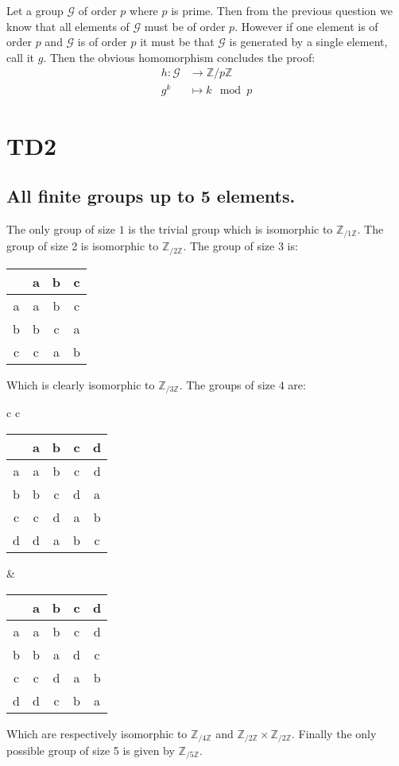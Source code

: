 \documentclass[10pt,a4paper]{book}
\begin{document}
\subsection{}
Let a group $\mathcal{G}$ of order $p$ where $p$ is prime. Then from the previous question we know that all elements of $\mathcal{G}$ must be of order $p$. However if one element is of order $p$ and $\mathcal{G}$ is of order $p$ it must be that $\mathcal{G}$ is generated by a single element, call it $g$. Then the obvious homomorphism concludes the proof:
\begin{align*}
h : \mathcal{G} &\to \mathbb{Z}/p\mathbb{Z}\\
g^k &\mapsto k \mod p
\end{align*}

\chapter{TD2}
\section{All finite groups up to 5 elements.}
The only group of size $1$ is the trivial group which is isomorphic to $\mathbb{Z}_{/1\mathbb{Z}}$. The group of size 2 is isomorphic to $\mathbb{Z}_{/2\mathbb{Z}}$. The group of size 3 is:
\begin{center}
\begin{tabular}{c | c | c | c |}
 & a & b & c\\
 \hline
 a & a & b & c\\
 \hline
 b & b & c & a \\
 \hline
 c & c & a & b

\end{tabular}
\end{center}
Which is clearly isomorphic to $\mathbb{Z}_{/3\mathbb{Z}}$. The groups of size 4 are:
\begin{center}
\begin{tabular}{c c}
\begin{tabular}{c | c | c | c | c |}
 & a & b & c & d\\
 \hline
 a & a & b & c & d\\
 \hline
 b & b & c & d & a\\
 \hline
 c & c & d & a & b\\
 \hline
 d & d & a & b & c
\end{tabular}
&
\begin{tabular}{c | c | c | c | c |}
 & a & b & c & d\\
 \hline
 a & a & b & c & d\\
 \hline
 b & b & a & d & c \\
 \hline
 c & c & d & a & b\\
 \hline
 d & d & c & b & a
\end{tabular}
\end{tabular}
\end{center}
Which are respectively isomorphic to $\mathbb{Z}_{/4\mathbb{Z}}$ and $\mathbb{Z}_{/2\mathbb{Z}} \times \mathbb{Z}_{/2\mathbb{Z}}$. Finally the only possible group of size 5 is given by $\mathbb{Z}_{/5\mathbb{Z}}$. 
\end{document}
